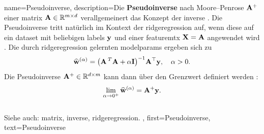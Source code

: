 \makeglossaries


{name={Pseudoinverse},
  description={Die \textbf{Pseudoinverse} nach Moore–Penrose ${\bf A}^{+}$ 
  	einer \gls{matrix} ${\bf A} \in \mathbb{R}^{m \times d}$ verallgemeinert das Konzept der 
  	\gls{inverse} \cite{GolubVanLoanBook}. Die Pseudoinverse tritt natürlich im Kontext der 
  	\gls{ridgeregression} auf, wenn diese auf ein \gls{dataset} mit beliebigen \glspl{label} ${\bf y}$ 
  	und einer \gls{featuremtx} ${\bf X} = {\bf A}$ angewendet wird \cite[Kap.\ 3]{hastie01statisticallearning}. 
  	Die durch \gls{ridgeregression} gelernten \gls{modelparams} ergeben sich zu
  	\[
  	\widehat{{\bf w}}^{(\alpha)}  = \big({\bf A}\,^{T} {\bf A} + \alpha \mathbf{I} \big)^{-1} {\bf A}^\top {\bf y}, \quad \alpha > 0.
  	\]
  	Die Pseudoinverse ${\bf A}^+ \in \mathbb{R}^{d \times m}$ kann dann über den Grenzwert definiert werden \cite[Kap. 3]{benisrael2003generalized}:
  	\[
  	\lim_{\alpha \to 0^+} \widehat{{\bf w}}^{(\alpha)} = {\bf A}^+ {\bf y}.
  	\]
  	\\
  	Siehe auch: \gls{matrix}, \gls{inverse}, \gls{ridgeregression}.
  },
 first={Pseudoinverse},
 text={Pseudoinverse}
}


